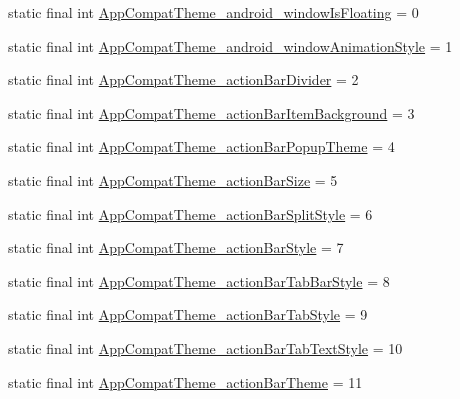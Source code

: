 \begin{DoxyCompactItemize}
static final int \mbox{\hyperlink{classandroid_1_1support_1_1v7_1_1appcompat_1_1R_1_1styleable_a76518c13bb691fa0ce88562201777677}{App\+Compat\+Theme\+\_\+android\+\_\+window\+Is\+Floating}} = 0
\item 
static final int \mbox{\hyperlink{classandroid_1_1support_1_1v7_1_1appcompat_1_1R_1_1styleable_aab662ec6e7b7c13b0cc7eefd6dc448ed}{App\+Compat\+Theme\+\_\+android\+\_\+window\+Animation\+Style}} = 1
\item 
static final int \mbox{\hyperlink{classandroid_1_1support_1_1v7_1_1appcompat_1_1R_1_1styleable_a0b6a6525bb825aaaecee70188288cb9e}{App\+Compat\+Theme\+\_\+action\+Bar\+Divider}} = 2
\item 
static final int \mbox{\hyperlink{classandroid_1_1support_1_1v7_1_1appcompat_1_1R_1_1styleable_a46d9d9ade7a2cbff036f30b78e1f8a32}{App\+Compat\+Theme\+\_\+action\+Bar\+Item\+Background}} = 3
\item 
static final int \mbox{\hyperlink{classandroid_1_1support_1_1v7_1_1appcompat_1_1R_1_1styleable_adcf6cf3f0cfa84f27687f9d615f0a74f}{App\+Compat\+Theme\+\_\+action\+Bar\+Popup\+Theme}} = 4
\item 
static final int \mbox{\hyperlink{classandroid_1_1support_1_1v7_1_1appcompat_1_1R_1_1styleable_a74f2d53b62c6128eda991786ee5dcfd1}{App\+Compat\+Theme\+\_\+action\+Bar\+Size}} = 5
\item 
static final int \mbox{\hyperlink{classandroid_1_1support_1_1v7_1_1appcompat_1_1R_1_1styleable_acb1649c0b7461ebc585fa51419a608e8}{App\+Compat\+Theme\+\_\+action\+Bar\+Split\+Style}} = 6
\item 
static final int \mbox{\hyperlink{classandroid_1_1support_1_1v7_1_1appcompat_1_1R_1_1styleable_af0c42e22b440ed03547894f75a6c8d59}{App\+Compat\+Theme\+\_\+action\+Bar\+Style}} = 7
\item 
static final int \mbox{\hyperlink{classandroid_1_1support_1_1v7_1_1appcompat_1_1R_1_1styleable_af090ecefe331b4df72abe9c0674e9154}{App\+Compat\+Theme\+\_\+action\+Bar\+Tab\+Bar\+Style}} = 8
\item 
static final int \mbox{\hyperlink{classandroid_1_1support_1_1v7_1_1appcompat_1_1R_1_1styleable_a013b2eecd9534f6bbc9905fc20d48e80}{App\+Compat\+Theme\+\_\+action\+Bar\+Tab\+Style}} = 9
\item 
static final int \mbox{\hyperlink{classandroid_1_1support_1_1v7_1_1appcompat_1_1R_1_1styleable_ab3821559efba8c3cd95dfb07a70866eb}{App\+Compat\+Theme\+\_\+action\+Bar\+Tab\+Text\+Style}} = 10
\item 
static final int \mbox{\hyperlink{classandroid_1_1support_1_1v7_1_1appcompat_1_1R_1_1styleable_a1fae51d5e6d7d0e64778028b25569704}{App\+Compat\+Theme\+\_\+action\+Bar\+Theme}} = 11

\end{DoxyCompactItemize}
